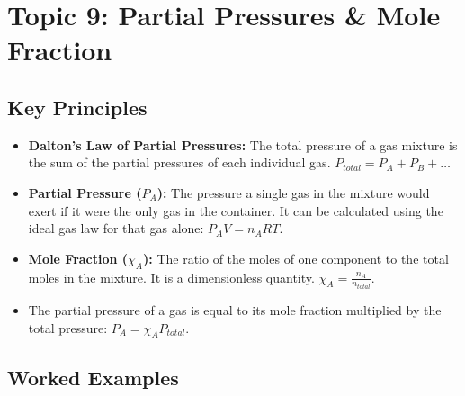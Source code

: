 \documentclass{article}
\begin{document}
\section{Topic 9: Partial Pressures \& Mole Fraction}
\subsection{Key Principles}
\begin{itemize}
    \item \textbf{Dalton's Law of Partial Pressures:} The total pressure of a gas mixture is the sum of the partial pressures of each individual gas. $P_{total} = P_A + P_B + \dots$
    \item \textbf{Partial Pressure ($P_A$):} The pressure a single gas in the mixture would exert if it were the only gas in the container. It can be calculated using the ideal gas law for that gas alone: $P_A V = n_A RT$.
    \item \textbf{Mole Fraction ($\chi_A$):} The ratio of the moles of one component to the total moles in the mixture. It is a dimensionless quantity. $\chi_A = \frac{n_A}{n_{total}}$.
    \item The partial pressure of a gas is equal to its mole fraction multiplied by the total pressure: $P_A = \chi_A P_{total}$.
\end{itemize}

\subsection{Worked Examples}
\end{document}
